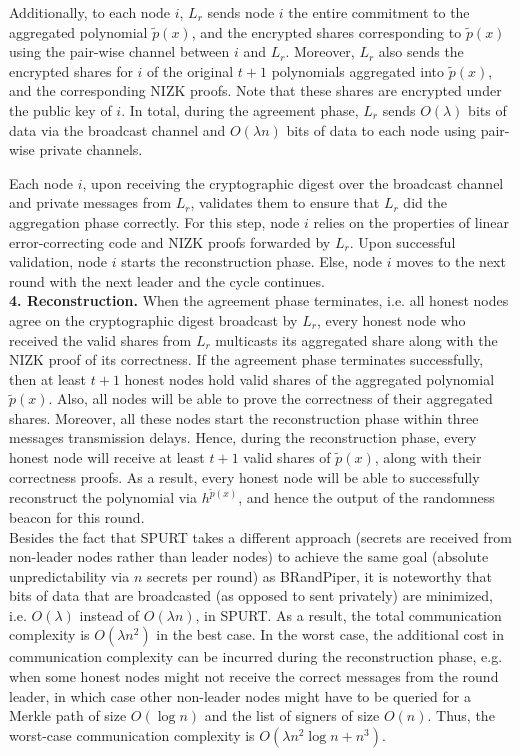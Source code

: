 \documentclass[letterpaper,twocolumn,10pt]{article}
\theoremstyle{definition}
\theoremstyle{remark}
\begin{document}
Additionally, to each node $i$, $L_r$ sends node $i$ the entire commitment to the aggregated polynomial $\tilde{p}(x)$, and the encrypted shares corresponding to $\tilde{p}(x)$ using the pair-wise channel between $i$ and $L_r$. Moreover, $L_r$ also sends the encrypted shares for $i$ of the original $t + 1$ polynomials aggregated into $\tilde{p}(x)$, and the corresponding NIZK proofs. Note that these shares are encrypted under the public key of $i$. In total, during the agreement phase, $L_r$ sends $O(\lambda)$ bits of data via the broadcast channel and $O(\lambda n)$ bits of data to each node using pair-wise private channels.

Each node $i$, upon receiving the cryptographic digest over the broadcast channel and private messages from $L_r$, validates them to ensure that $L_r$ did the aggregation phase correctly. For this step, node $i$ relies on the properties of linear error-correcting code and NIZK proofs forwarded by $L_r$. Upon successful validation, node $i$ starts the reconstruction phase. Else, node $i$ moves to the next round with the next leader and the cycle continues.\\

\textbf{4. Reconstruction.} When the agreement phase terminates, i.e. all honest nodes agree on the cryptographic digest broadcast by $L_r$, every honest node who received the valid shares from $L_r$ multicasts its aggregated share along with the NIZK proof of its correctness. If the agreement phase terminates successfully, then at least $t + 1$ honest nodes hold valid shares of the aggregated polynomial $\tilde{p}(x)$. Also, all nodes will be able to prove the correctness of their aggregated shares. Moreover, all these nodes start the reconstruction phase within three messages transmission delays. Hence, during the reconstruction phase, every honest node will receive at least $t + 1$ valid shares of $\tilde{p}(x)$, along with their correctness proofs. As a result, every honest node will be able to successfully reconstruct the polynomial via $h^{\tilde{p}(x)}$, and hence the output of the randomness beacon for this round.\\

Besides the fact that SPURT takes a different approach (secrets are received from non-leader nodes rather than leader nodes) to achieve the same goal (absolute unpredictability via $n$ secrets per round) as BRandPiper, it is noteworthy that bits of data that are broadcasted (as opposed to sent privately) are minimized, i.e. $O(\lambda)$ instead of $O(\lambda n)$, in SPURT. As a result, the total communication complexity is $O(\lambda n^2)$ in the best case. In the worst case, the additional cost in communication complexity can be incurred during the reconstruction phase, e.g. when some honest nodes might not receive the correct messages from the round leader, in which case other non-leader nodes might have to be queried for a Merkle path of size $O(\log n)$ and the list of signers of size $O(n)$. Thus, the worst-case communication complexity is $O(\lambda n^2 \log n + n^3)$.
\end{document}

